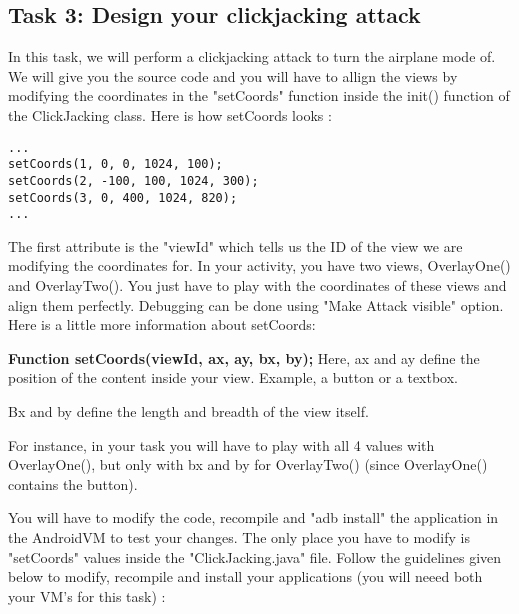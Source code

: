 \subsection{Task 3: Design your clickjacking attack}

In this task, we will perform a clickjacking attack to turn the airplane
mode of. We will give you the source code and you will have to allign the
views by modifying the coordinates in the "setCoords" function inside the
init() function of the ClickJacking class.  Here is how setCoords looks :

\begin{lstlisting}
...
setCoords(1, 0, 0, 1024, 100);
setCoords(2, -100, 100, 1024, 300);
setCoords(3, 0, 400, 1024, 820);
...
\end{lstlisting}

The first attribute is the "viewId" which tells us the ID of the view we are modifying the coordinates for. In your activity, you have two views, OverlayOne() and OverlayTwo(). You just have to play with the coordinates of these views and align them perfectly. Debugging can be done using "Make Attack visible" option. Here is a little more information about setCoords:

\textbf{Function setCoords(viewId, ax, ay, bx, by);}
Here, ax and ay define the position of the content inside your view. Example, a button or a textbox. 

Bx and by define the length and breadth of the view itself.

For instance, in your task you will have to play with all 4 values with
OverlayOne(), but only with bx and by for OverlayTwo() (since OverlayOne()
contains the button).

You will have to modify the code, recompile and "adb install" the
application in the AndroidVM to test your changes. The only place you have
to modify is "setCoords" values inside the "ClickJacking.java" file. Follow
the guidelines given below to modify, recompile and install your
applications (you will neeed both your VM's for this task) : 


